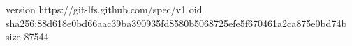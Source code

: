 version https://git-lfs.github.com/spec/v1
oid sha256:88d618e0bd66aac39ba390935fd8580b5068725efe5f670461a2ca875e0bd74b
size 87544
